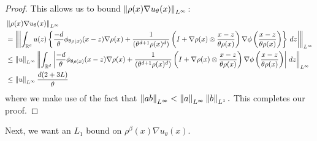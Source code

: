 \begin{proof}
  This allows us to bound $\left\lVert \rho(x) \nabla u_{\theta}(x) \right\rVert_{{L^\infty}}$:
  \begin{align}
  & \left\lVert \rho (x) \nabla u_\theta(x) \right\rVert_{{L^\infty}}
  \\
  & = \left\lVert  \left| \int_{\mathbb{R}^d} u(z) \left\{
    \frac{-d}{\theta} \phi_{\theta \rho(x)}(x-z) \nabla
    \rho(x)
    + \frac{1}{(\theta^{d+1} \rho(x)^{d})} 
    \left( I 
      + \nabla \rho(x) \otimes \frac{x-z}{\theta \rho(x)} \right)
    \nabla \phi \left(\frac{x-z}{\theta \rho(x)} \right) \right\}
  \, dz \right|  \right\rVert_{{L^\infty}}
  \\
  & \leq \left\lVert u \right\rVert_{{L^\infty}} \left\lVert  \int_{\mathbb{R}^d} \left| 
    \frac{-d}{\theta} \phi_{\theta \rho(x)}(x-z) \nabla
    \rho(x)
    + \frac{1}{(\theta^{d+1} \rho(x)^{d})} 
    \left( I 
      + \nabla \rho(x) \otimes \frac{x-z}{\theta \rho(x)} \right)
    \nabla \phi \left(\frac{x-z}{\theta \rho(x)} \right)
  \right| \, dz \right\rVert_{{L^\infty}}
  \\
  & \leq \left\lVert u \right\rVert_{{L^\infty}} \frac{d(2+3L)}{\theta}
  \end{align}
  where we make use of the fact that
    $\left\lVert ab \right\rVert_{{L^\infty}} < \left\lVert a \right\rVert_{{L^\infty}}\left\lVert b \right\rVert_{L^1}.$
  This completes our proof.
  \end{proof}

  Next, we want an $L_1$ bound on $\rho^{\beta}(x) \nabla
  u_{\theta}(x)$.

